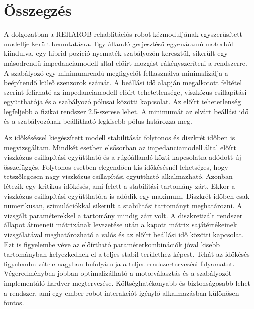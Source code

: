 \chapter{Összegzés}\label{chap:summary}

A dolgozatban a REHAROB rehablitációs robot kézmoduljának egyszerűsített modellje került bemutatásra. Egy állandó 
gerjesztésű egyenáramú motorból kiindulva, egy hibrid pozíció-nyomaték szabályozón keresztül, sikerült egy másodrendű 
impedanciamodell által előírt mozgást rákényszeríteni a rendszerre. A szabályozó egy minimumrendű megfigyelőt 
felhasználva minimalizálja a beépítendő külső szenzorok számát. A beállási idő alapján megalkotott feltétel 
szerint felírható az impedanciamodell előírt tehetetlensége, viszkózus csillapítási együtthatója és a szabályozó 
pólusai közötti kapcsolat. Az előírt tehetetlenség legfeljebb a fizikai rendszer 2.5-szerese lehet. A minimumát az 
elvárt beállási idő és a szabályozónak beállítható legkisebb pólus határozza meg. 

Az időkéséssel kiegészített modell stabilitását folytonos és diszkrét időben is megvizsgáltam. Mindkét 
esetben elsősorban az impedanciamodell által előírt viszkózus csillapítási együttható és a rúgóállandó közti 
kapcsolatra adódott új összefüggés. Folytonos esetben elegendően kis időkésésnél lehetséges, hogy tetszőlegesen 
nagy viszkózus csillapítási együttható alkalmazható. Azonban létezik egy kritikus időkésés, ami felett 
a stabilitási tartomány zárt. Ekkor a viszkózus csillapítási együtthatóra is adódik egy maximum. Diszkrét időben csak numerikusan, szimulációkkal sikerült a stabilitási tartományt
meghatározni. A vizsgált paraméterekkel a tartomány mindig zárt volt. A diszkretizált rendszer állapot átmeneti mátrixának 
levezetése után a kapott mátrix sajátértékeinek
vizsgálatával meghatározható a valós és az előírt beállási idő közötti kapcsolat. Ezt is figyelembe véve az 
előírtható paraméterkombinációk jóval kisebb tartományban helyezkednek el a teljes stabil területhez képest. Tehát 
az időkésés figyelembe vétele nagyban befolyásolja a teljes rendszertervezési folyamatot. Végeredményben jobban 
optimalizálható a motorválasztás és a szabályozót implementáló hardver megtervezése. Költséghatékonyabb és biztonságosabb 
lehet a rendszer, ami egy ember-robot interakciót igénylő alkalmazásban különösen fontos. 

